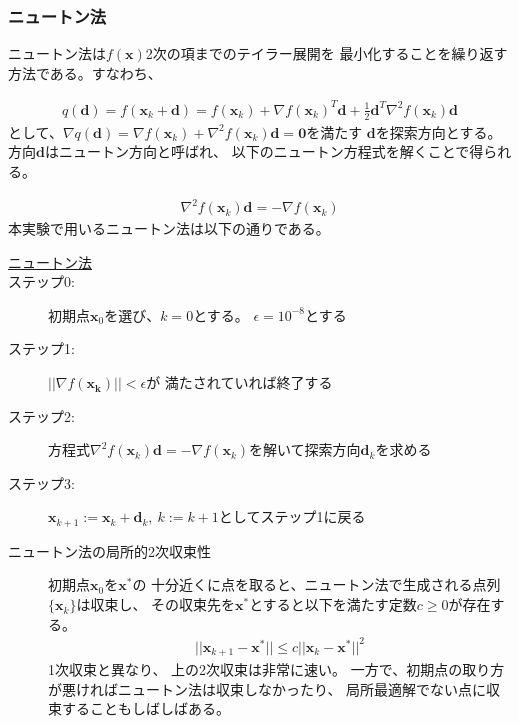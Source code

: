 \documentclass[12pt]{jarticle}
\begin{document}
\subsubsection{ニュートン法}
ニュートン法は$f(\boldsymbol{x})$2次の項までのテイラー展開を
最小化することを繰り返す方法である。すなわち、

\begin{eqnarray}
    q(\boldsymbol{d})=f(\boldsymbol{x}_k+\boldsymbol{d})=f(\boldsymbol{x}_k)+\nabla f(\boldsymbol{x}_k)^T \boldsymbol{d}+\frac{1}{2}\boldsymbol{d}^T \nabla^2 f(\boldsymbol{x}_k)\boldsymbol{d}\nonumber
\end{eqnarray}
として、$\nabla q(\boldsymbol{d})=\nabla f(\boldsymbol{x}_k)+\nabla^2 f(\boldsymbol{x}_k)\boldsymbol{d}=\boldsymbol{0}$を満たす
$\boldsymbol{d}$を探索方向とする。
方向$\boldsymbol{d}$はニュートン方向と呼ばれ、
以下のニュートン方程式を解くことで得られる。

\begin{eqnarray}
    \nabla^2f(\boldsymbol{x}_k)\boldsymbol{d}=-\nabla f(\boldsymbol{x}_k)\nonumber
\end{eqnarray}
本実験で用いるニュートン法は以下の通りである。

\begin{description}
    \item [\underline{ニュートン法}]
    \item [ステップ0:] 初期点$\boldsymbol{x}_0$を選び、$k=0$とする。
          $\epsilon=10^{-8}$とする
    \item [ステップ1:] $||\nabla f(\boldsymbol{x_k})||<\epsilon$が
          満たされていれば終了する
    \item [ステップ2:] 方程式$\nabla^2 f(\boldsymbol{x}_k)\boldsymbol{d}=-\nabla f(\boldsymbol{x}_k)$を解いて探索方向$\boldsymbol{d}_k$を求める
    \item [ステップ3:] $\boldsymbol{x}_{k+1}:=\boldsymbol{x}_k+\boldsymbol{d}_k,\ k:=k+1$としてステップ1に戻る
\end{description}

\begin{description}
    \item[ニュートン法の局所的2次収束性] 初期点$\boldsymbol{x}_0$を$\boldsymbol{x}^*$の
          十分近くに点を取ると、ニュートン法で生成される点列$\{\boldsymbol{x}_k\}$は収束し、
          その収束先を$\boldsymbol{x}^*$とすると以下を満たす定数$c\geq 0$が存在する。
          \begin{eqnarray}
              ||\boldsymbol{x}_{k+1}-\boldsymbol{x}^*||\leq c||\boldsymbol{x}_{k}-\boldsymbol{x}^*||^2\nonumber
          \end{eqnarray}
          1次収束と異なり、
          上の2次収束は非常に速い。
          一方で、初期点の取り方が悪ければニュートン法は収束しなかったり、
          局所最適解でない点に収束することもしばしばある。
\end{description}
\end{document}
